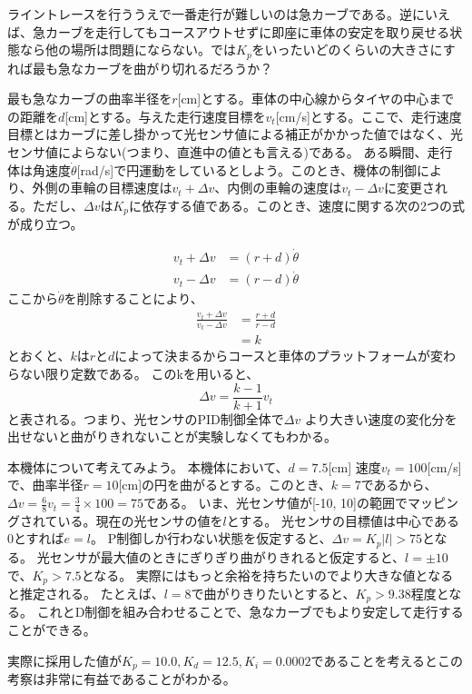 \documentclass{ltjsreport}
\begin{document}
ライントレースを行ううえで一番走行が難しいのは急カーブである。逆にいえば、急カーブを走行してもコースアウトせずに即座に車体の安定を取り戻せる状態なら他の場所は問題にならない。では$K_p$をいったいどのくらいの大きさにすれば最も急なカーブを曲がり切れるだろうか？

最も急なカーブの曲率半径を$r$[cm]とする。車体の中心線からタイヤの中心までの距離を$d$[cm]とする。与えた走行速度目標を$v_t$[cm/s]とする。ここで、走行速度目標とはカーブに差し掛かって光センサ値による補正がかかった値ではなく、光センサ値によらない(つまり、直進中の値とも言える)である。
ある瞬間、走行体は角速度$\dot{\theta}$[rad/s]で円運動をしているとしよう。このとき、機体の制御により、外側の車輪の目標速度は$v_t + \Delta v$、内側の車輪の速度は$v_t - \Delta v$に変更される。ただし、$\Delta v $は$K_p$に依存する値である。このとき、速度に関する次の2つの式が成り立つ。

\begin{align}
  v_t + \Delta v &= (r+d)\dot{\theta}\\
  v_t - \Delta v &= (r-d)\dot{\theta}
\end{align}
ここから$\dot{\theta}$を削除することにより、
\begin{align}
  \frac{v_t+ \Delta v}{v_t-\Delta v} &= \frac{r+d}{r-d}\\
                                    &= k
\end{align}
とおくと、$k$は$r$と$d$によって決まるからコースと車体のプラットフォームが変わらない限り定数である。
このkを用いると、
\[
  \Delta v = \frac{k-1}{k+1}v_t
\]
と表される。つまり、光センサのPID制御全体で$\Delta v$ より大きい速度の変化分を出せないと曲がりきれないことが実験しなくてもわかる。

本機体について考えてみよう。
本機体において、$d=7.5$[cm]
速度$v_t =100$[cm/s]で、曲率半径$r=10$[cm]の円を曲がるとする。このとき、$k = 7$であるから、
$\Delta v = \frac{6}{8}v_t = \frac{3}{4}\times 100 = 75$である。
いま、光センサ値が[-10, 10]の範囲でマッピングされている。現在の光センサの値を$l$とする。
光センサの目標値は中心である0とすれば$e=l$。
P制御しか行わない状態を仮定すると、$\Delta v = K_p |l| > 75$となる。
光センサが最大値のときにぎりぎり曲がりきれると仮定すると、$l=\pm 10$で、$K_p > 7.5$となる。
実際にはもっと余裕を持ちたいのでより大きな値となると推定される。
たとえば、$l=8$で曲がりきりたいとすると、$K_p > 9.38$程度となる。
これとD制御を組み合わせることで、急なカーブでもより安定して走行することができる。

実際に採用した値が$K_p=10.0, K_d = 12.5, K_i = 0.0002$であることを考えるとこの考察は非常に有益であることがわかる。
\end{document}
